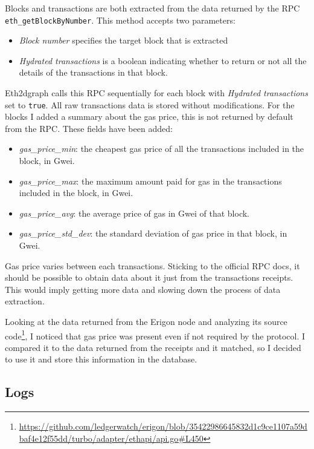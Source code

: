 Blocks and transactions are both extracted from the data returned by the RPC \texttt{eth\_getBlockByNumber}. 
This method accepts two parameters:

\begin{itemize}
    \item \textit{Block number} specifies the target block that is extracted
    \item \textit{Hydrated transactions} is a boolean indicating whether to return or not all the details of the transactions in that block.
\end{itemize}

Eth2dgraph calls this RPC sequentially for each block with \textit{Hydrated transactions} set to \texttt{true}. All raw transactions data is stored without modifications. For the blocks I added a summary about the gas price, this is not returned by  default from the RPC. These fields have been added: 

\begin{itemize}
    \item \textit{gas\_price\_min}: the cheapest gas price of all the transactions included in the block, in Gwei.
    \item \textit{gas\_price\_max}: the maximum amount paid for gas in the transactions included in the block, in Gwei.
    \item \textit{gas\_price\_avg}: the average price of gas in Gwei of that block.
    \item \textit{gas\_price\_std\_dev}: the standard deviation of gas price in that block, in Gwei.
\end{itemize}

Gas price varies between each transactions. Sticking to the official RPC docs, it should be possible to obtain data about it just from the transactions receipts. This would imply getting more data and slowing down the process of data extraction.

Looking at the data returned from the Erigon node and analyzing its source code\footnote{\url{https://github.com/ledgerwatch/erigon/blob/35422986645832d1c9ce1107a59dbaf4e12f55dd/turbo/adapter/ethapi/api.go\#L450}}, I noticed that gas price was present even if not required by the protocol. I compared it to the data returned from the receipts and it matched, so I decided to use it and store this information in the database.

\subsection{Logs}

